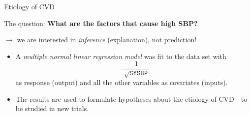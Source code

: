 \documentclass[10pt,ignorenonframetext,]{beamer}
\providecommand{\tightlist}{%
  \setlength{\itemsep}{0pt}\setlength{\parskip}{0pt}}
\begin{document}
\begin{frame}

\begin{block}{Etiology of CVD}

\vspace{3mm}

The question: \textbf{What are the factors that cause high SBP?}

\vspace{2mm}

\(\rightarrow\) we are interested in \emph{inference} (explanation), not
prediction!

\vspace{4mm}

\begin{itemize}
\tightlist
\item
  A \emph{multiple normal linear regression model} was fit to the data
  set with \[-\frac{1}{\sqrt{\texttt{SYSBP}}}\] as response (output) and
  all the other variables as covariates (inputs).
\end{itemize}

\vspace{2mm}

\begin{itemize}
\tightlist
\item
  The results are used to formulate hypotheses about the etiology of CVD
  - to be studied in new trials.
\end{itemize}

\end{block}

\end{frame}
\end{document}

